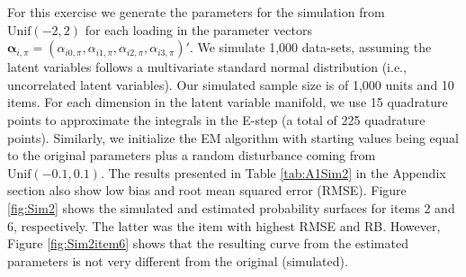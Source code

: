 \documentclass[11pt, a4paper]{article}
\begin{document}
For this exercise we generate the parameters for the simulation from $\text{Unif}(-2,2)$ for each loading in the parameter vectors $\bm{\alpha}_{i,\pi} = (\alpha_{i0,\pi}, \alpha_{i1,\pi}, \alpha_{i2,\pi}, \alpha_{i3,\pi})'$. We simulate 1,000 data-sets, assuming the latent variables follows a multivariate standard normal distribution (i.e., uncorrelated latent variables). Our simulated sample size is of 1,000 units and 10 items. For each dimension in the latent variable manifold, we use 15 quadrature points to approximate the integrals in the E-step (a total of 225 quadrature points). Similarly, we initialize the EM algorithm with starting values being equal to the original parameters plus a random disturbance coming from $\text{Unif}(-0.1,0.1)$. The results presented in Table \ref{tab:A1Sim2} in the Appendix section also show low bias and root mean squared error (RMSE). Figure \ref{fig:Sim2} shows the simulated and estimated probability surfaces for items 2 and 6, respectively. The latter was the item with highest RMSE and RB. However, Figure \ref{fig:Sim2item6} shows that the resulting curve from the estimated parameters is not very different from the original (simulated).
\end{document}
